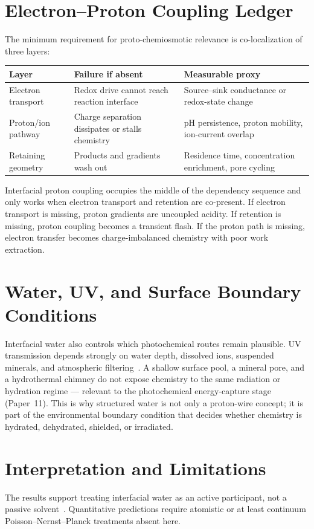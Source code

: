 \documentclass[11pt,a4paper]{article}
\begin{document}
\section{Electron--Proton Coupling Ledger}
The minimum requirement for proto-chemiosmotic relevance is co-localization of three layers:
\begin{center}
\small
\begin{tabular}{p{}p{}p{}}
\toprule
Layer & Failure if absent & Measurable proxy \\
\midrule
Electron transport & Redox drive cannot reach reaction interface & Source--sink conductance or redox-state change \\
Proton/ion pathway & Charge separation dissipates or stalls chemistry & pH persistence, proton mobility, ion-current overlap \\
Retaining geometry & Products and gradients wash out & Residence time, concentration enrichment, pore cycling \\
\bottomrule
\end{tabular}
\end{center}
Interfacial proton coupling occupies the middle of the dependency sequence and only works when electron transport and retention are co-present. If electron transport is missing, proton gradients are uncoupled acidity. If retention is missing, proton coupling becomes a transient flash. If the proton path is missing, electron transfer becomes charge-imbalanced chemistry with poor work extraction.

\section{Water, UV, and Surface Boundary Conditions}
Interfacial water also controls which photochemical routes remain plausible. UV transmission depends strongly on water depth, dissolved ions, suspended minerals, and atmospheric filtering~\cite{Ranjan2017,Ranjan2022}. A shallow surface pool, a mineral pore, and a hydrothermal chimney do not expose chemistry to the same radiation or hydration regime --- relevant to the photochemical energy-capture stage (Paper~11). This is why structured water is not only a proton-wire concept; it is part of the environmental boundary condition that decides whether chemistry is hydrated, dehydrated, shielded, or irradiated.

\section{Interpretation and Limitations}
The results support treating interfacial water as an active participant, not a passive solvent~\cite{Lane2010}. Quantitative predictions require atomistic or at least continuum Poisson--Nernst--Planck treatments absent here.
\end{document}
